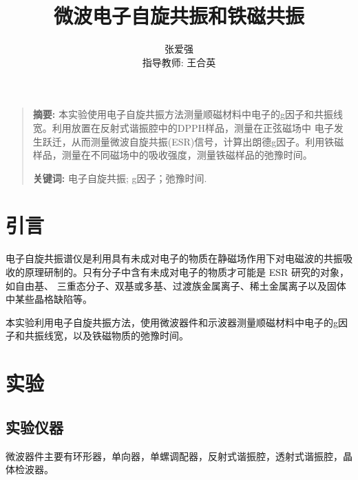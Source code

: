 \documentclass[10pt]{ctexart}
\title{微波电子自旋共振和铁磁共振}
\author{张爱强\\指导教师: 王合英}
\date{}
\newenvironment{sciabstract}{%
\begin{quote} \textbf{摘要: }}
{\end{quote}}
\begin{document}
\maketitle
\begin{sciabstract}
    本实验使用电子自旋共振方法测量顺磁材料中电子的g因子和共振线宽。利用放置在反射式谐振腔中的DPPH样品，测量在正弦磁场中
    电子发生跃迁，从而测量微波自旋共振(ESR)信号，计算出朗德g因子。利用铁磁样品，测量在不同磁场中的吸收强度，测量铁磁样品的弛豫时间。
    \par\textbf{关键词: } 电子自旋共振; g因子；弛豫时间.
\end{sciabstract}
\section{引言}
电子自旋共振谱仪是利用具有未成对电子的物质在静磁场作用下对电磁波的共振吸
收的原理研制的。只有分子中含有未成对电子的物质才可能是 ESR 研究的对象，如自由基、
三重态分子、双基或多基、过渡族金属离子、稀土金属离子以及固体中某些晶格缺陷等。

本实验利用电子自旋共振方法，使用微波器件和示波器测量顺磁材料中电子的g因子和共振线宽，以及铁磁物质的弛豫时间。
\section{实验}
\subsection{实验仪器}
微波器件主要有环形器，单向器，单螺调配器，反射式谐振腔，透射式谐振腔，晶体检波器。
\end{document}
